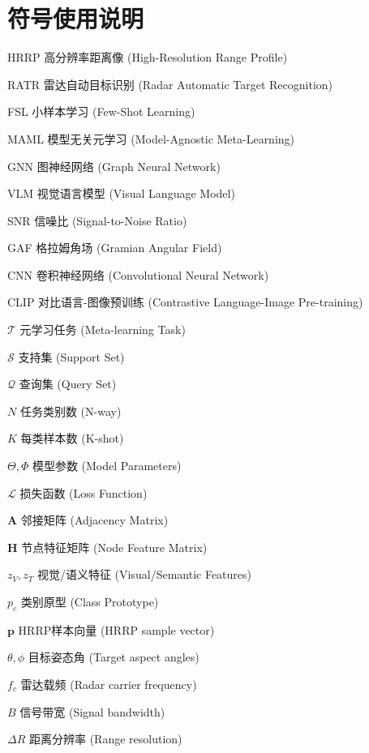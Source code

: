 \chapter*{符号使用说明}

\begin{denotation}

\item[HRRP] 高分辨率距离像 (High-Resolution Range Profile)
\item[RATR] 雷达自动目标识别 (Radar Automatic Target Recognition)
\item[FSL] 小样本学习 (Few-Shot Learning)
\item[MAML] 模型无关元学习 (Model-Agnostic Meta-Learning)
\item[GNN] 图神经网络 (Graph Neural Network)
\item[VLM] 视觉语言模型 (Visual Language Model)
\item[SNR] 信噪比 (Signal-to-Noise Ratio)
\item[GAF] 格拉姆角场 (Gramian Angular Field)
\item[CNN] 卷积神经网络 (Convolutional Neural Network)
\item[CLIP] 对比语言-图像预训练 (Contrastive Language-Image Pre-training)
\item[$\mathcal{T}$] 元学习任务 (Meta-learning Task)
\item[$\mathcal{S}$] 支持集 (Support Set)
\item[$\mathcal{Q}$] 查询集 (Query Set)
\item[$N$] 任务类别数 (N-way)
\item[$K$] 每类样本数 (K-shot)
\item[$\Theta, \Phi$] 模型参数 (Model Parameters)
\item[$\mathcal{L}$] 损失函数 (Loss Function)
\item[$\mathbf{A}$] 邻接矩阵 (Adjacency Matrix)
\item[$\mathbf{H}$] 节点特征矩阵 (Node Feature Matrix)
\item[$z_V, z_T$] 视觉/语义特征 (Visual/Semantic Features)
\item[$p_c$] 类别原型 (Class Prototype)
\item[$\mathbf{p}$] HRRP样本向量 (HRRP sample vector)
\item[$\theta, \phi$] 目标姿态角 (Target aspect angles)
\item[$f_c$] 雷达载频 (Radar carrier frequency)
\item[$B$] 信号带宽 (Signal bandwidth)
\item[$\Delta R$] 距离分辨率 (Range resolution)

\end{denotation}